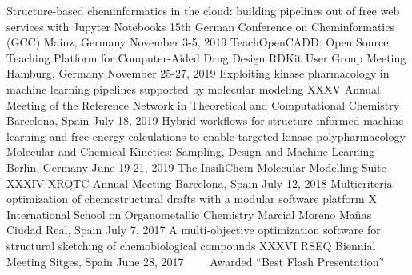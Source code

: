 


\begin{cventries}

  \cventry
    {Structure-based cheminformatics in the cloud: building pipelines out of free web services with Jupyter Notebooks} %
    {15th German Conference on Cheminformatics (GCC)} %
    {Mainz, Germany} %
    {November 3-5, 2019} %
    {}
  \cventry
    {TeachOpenCADD: Open Source Teaching Platform for Computer-Aided Drug Design} %
    {RDKit User Group Meeting} %
    {Hamburg, Germany} %
    {November 25-27, 2019} %
    {}
  \cventry
    {Exploiting kinase pharmacology in machine learning pipelines supported by molecular modeling} %
    {XXXV Annual Meeting of the Reference Network in Theoretical and Computational Chemistry} %
    {Barcelona, Spain} %
    {July 18, 2019} %
    {}
  \cventry
    {Hybrid workflows for structure-informed machine learning and free energy calculations to enable targeted kinase polypharmacology} %
    {Molecular and Chemical Kinetics: Sampling, Design and Machine Learning} %
    {Berlin, Germany} %
    {June 19-21, 2019} %
    {}
  \cventry
    {The InsiliChem Molecular Modelling Suite} %
    {XXXIV XRQTC Annual Meeting} %
    {Barcelona, Spain} %
    {July 12, 2018} %
    {}
  \cventry
    {Multicriteria optimization of chemostructural drafts with a modular software platform} %
    {X International School on Organometallic Chemistry Marcial Moreno Mañas} %
    {Ciudad Real, Spain} %
    {July 7, 2017} %
    {}
  \cventry
    {A multi-objective optimization software for structural sketching of chemobiological compounds} %
    {XXXVI RSEQ Biennial Meeting} %
    {Sitges, Spain} %
    {June 28, 2017} %
    {~~~~\footnotesize{\faTag\acvHeaderIconSep\acvHeaderIconSep Awarded ``Best Flash Presentation''}}


\end{cventries}

